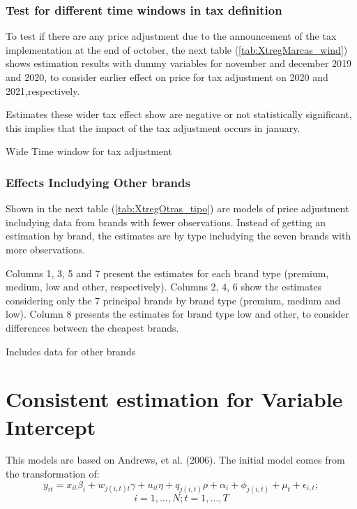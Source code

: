 \documentclass[]{article}
\begin{document}
\subsubsection{Test for different time windows in tax definition}
To test if there are any price adjustment due to the announcement of the tax implementation at the end of october, the next table (\ref{tab:XtregMarcas_wind}) shows estimation results with dummy variables for november and december 2019 and 2020, to consider earlier effect on price for tax adjustment on 2020 and 2021,respectively.
 
Estimates these wider tax effect show are negative or not statistically significant, this implies that the impact of the tax adjustment occurs in january. 

\begin{landscape}
 	\begin{table}[ht]
 	\centering
 	\caption{Wide Time window for tax adjustment \label{tab:XtregMarcas_wind}}
 	
 \end{table}
\end{landscape}

\subsubsection{Effects Includying Other brands}
Shown in the next table (\ref{tab:XtregOtras_tipo}) are models of price adjustment includying data from brands with fewer observations. Instead of getting an estimation by brand, the estimates are by type includying the seven brands with more observations. 

Columns 1, 3, 5 and 7 present the estimates for each brand type (premium, medium, low and other, respectively). Columns 2, 4, 6 show the estimates considering only the 7 principal brands by brand type (premium, medium and low). Column 8 presents the estimates for brand type low and other, to consider differences between the cheapest brands.


\begin{landscape}
	\begin{table}[ht]
		\centering
		\caption{Includes data for other brands \label{tab:XtregOtras_tipo}}
		
	\end{table}
\end{landscape}
 
\section{Consistent estimation for Variable Intercept}
This models are based on Andrews, et al. (2006). The initial model comes from the transformation of:
\begin{equation*}
	y_{it} = x_{it} \beta_{i} + w_{j(i,t)t} \gamma + u_{it} \eta + q_{j(i,t)} \rho + \alpha_{i}  + \phi_{j(i,t)} + \mu_{t} + \epsilon_{i,t}; 
\end{equation*}
$$i = 1,\ldots,N; t=1,\ldots,T$$
\end{document}
